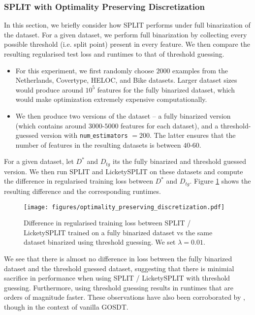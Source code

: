 \subsubsection{SPLIT with Optimality Preserving Discretization}
\label{sec:optimality_gap_binarization}
In this section, we briefly consider how SPLIT performs under full binarization of the dataset. For a given dataset, we perform full binarization by collecting every possible threshold (i.e. split point) present in every feature. We then compare the resulting regularised test loss and runtimes to that of threshold guessing. 
\begin{itemize}
    \item For this experiment, we first randomly choose $2000$ examples from the Netherlands, Covertype, HELOC, and Bike datasets. Larger dataset sizes would produce around $10^5$ features for the fully binarized dataset, which would make optimization extremely expensive computationally. 
    \item We then produce two versions of the dataset -- a fully binarized version (which contains around $3000$-$5000$ features for each dataset), and a threshold-guessed version \cite{gosdt_guesses} with \texttt{num$\_$estimators} $=200$. The latter ensures that the number of features in the resulting datasets is between $40$-$60$. 
\end{itemize}
For a given dataset, let $D^*$ and $D_{tg}$ its the fully binarized and threshold guessed version. We then run SPLIT and LicketySPLIT on these datasets and compute the difference in regularised training loss between $D^*$ and $D_{tg}$. Figure \ref{fig:optimality_preserving_discretization} shows the resulting difference and the corresponding runtimes. 
\begin{figure}[H]
    \centering
    \texttt{[image: figures/optimality\_preserving\_discretization.pdf]}
    \caption{Difference in regularised training loss between SPLIT / LicketySPLIT trained on a fully binarized dataset vs the same dataset binarized using threshold guessing. We set $\lambda = 0.01$.}
    \label{fig:optimality_preserving_discretization}
\end{figure}
We see that there is almost no difference in loss between the fully binarized dataset and the threshold guessed dataset, suggesting that there is minimial sacrifice in performance when using SPLIT / LicketySPLIT with threshold guessing. Furthermore, using threshold guessing results in runtimes that are orders of magnitude faster. These observations have also been corroborated by \citet{gosdt_guesses}, though in the context of vanilla GOSDT. 


